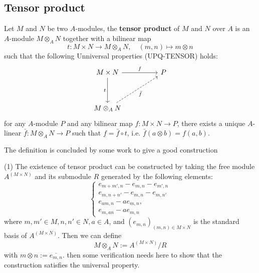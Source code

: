 \documentclass[12pt,a4paper]{article}
\begin{document}
\subsection{Tensor product}

\begin{definition}
    Let \(M\) and \(N\) be two \(A\)-modules, the \textbf{tensor product} of \(M\) and \(N\) over \(A\) is an \(A\)-module \(M \otimes_A N\) together with a bilinear map
    \[t : M \times N \to M \otimes_A N, \quad (m,n) \mapsto m \otimes n\]
    such that the following Unniversal properties (UPQ-TENSOR) holds:
\[\begin{tikzcd}
	{M \times N} && P \\
	\\
	{M\otimes_AN}
	\arrow["f", from=1-1, to=1-3]
	\arrow["t"', from=1-1, to=3-1]
	\arrow["{\bar{f}}"', dashed, from=3-1, to=1-3]
\end{tikzcd}\]
    for any \(A\)-module \(P\) and any bilinear map \(f: M \times N \to P\), there exists a unique \(A\)-linear \(\bar{f}: M \otimes_A N \to P\) such that \(f = \bar{f} \circ t\), i.e. \(\bar{f}(a \otimes b) = f(a,b)\).
\end{definition}

    The definition is concluded by some work to give a good construction

    (1) The existence of tensor product can be constructed by taking the free module \(A^{(M\times N)}\) and its submodule \(R\) generated by the following elements:
    \[\begin{cases}
        e_{m+m',n}-e_{m,n}-e_{m',n} \\
        e_{m,n+n'}-e_{m,n}-e_{m,n'} \\
        e_{am,n}-a e_{m,n}, \\
        e_{m,an}-a e_{m,n}
    \end{cases}\]
    where \(m,m' \in M, n,n' \in N, a \in A\), and \((e_{m,n})_{(m,n)\in M\times N}\) is the standard basis of \(A^{(M\times N)}\). Then we can define
    \[M \otimes_A N := A^{(M\times N)}/R\]
    with \(m\otimes n:=\overline{e_{m,n}}\). then some verification needs here to show that the construction satisfies the universal property.\\
\end{document}
